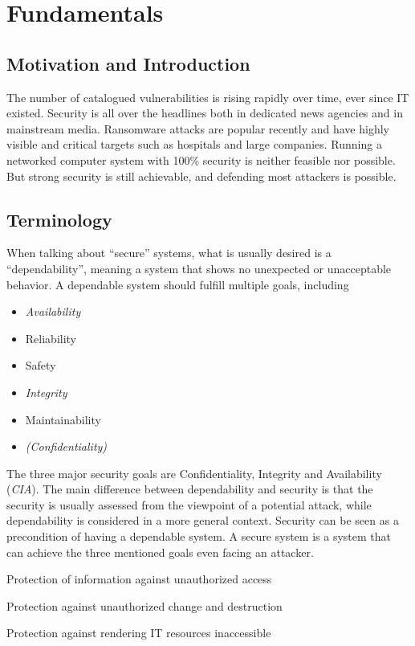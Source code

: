 \chapter{Fundamentals}
\section{Motivation and Introduction}
The number of catalogued vulnerabilities is rising rapidly over time, ever since
IT existed. Security is all over the headlines both in dedicated news agencies
and in mainstream media. Ransomware attacks are popular recently and have highly
visible and critical targets such as hospitals and large companies. Running a
networked computer system with 100\% security is neither feasible nor possible.
But strong security is still achievable, and defending most attackers is
possible.

\section{Terminology}
When talking about ``secure'' systems, what is usually desired is a
``dependability'', meaning a system that shows no unexpected or unacceptable
behavior. A dependable system should fulfill multiple goals, including
\begin{itemize}
    \item \emph{Availability}
    \item Reliability
    \item Safety
    \item \emph{Integrity}
    \item Maintainability
    \item \emph{(Confidentiality)}
\end{itemize}

The three major security goals are Confidentiality, Integrity and Availability
(\emph{CIA}). The main difference between dependability and security is that the
security is usually assessed from the viewpoint of a potential attack, while
dependability is considered in a more general context. Security can be seen as a
precondition of having a dependable system. A secure system is a system that can
achieve the three mentioned goals even facing an attacker.

\begin{description}[align=right,labelwidth=3cm]
    \item[Confidentiality] Protection of information against unauthorized access
    \item[Integrity] Protection against unauthorized change and destruction
    \item[Availability] Protection against rendering IT resources inaccessible
\end{description}

